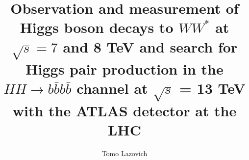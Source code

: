 \title{Observation and measurement of Higgs boson decays to $WW^*$ at $\sqrt{s} = 7$ and 8 TeV and search for Higgs pair production in the $HH\rightarrow
  b\bar{b}b\bar{b}$ channel at $\sqrt{s}$ = 13 TeV with the ATLAS detector at the LHC}
\author{Tomo Lazovich}



